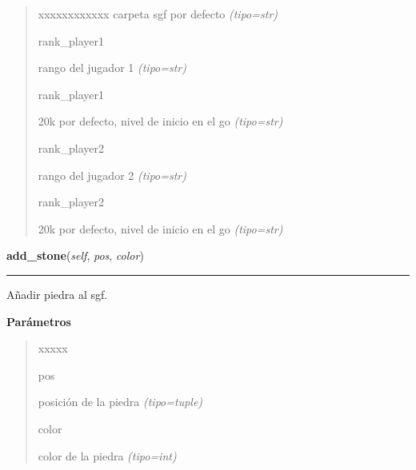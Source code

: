 \begin{boxedminipage}{\funcwidth}
\begin{quote}
\begin{Ventry}{xxxxxxxxxxxx}
carpeta sgf por defecto
            {\it (tipo=str)}

          \item[rank\_player1]


rango del jugador 1
            {\it (tipo=str)}

          \item[rank\_player1]


20k por defecto, nivel de inicio en el go
            {\it (tipo=str)}

          \item[rank\_player2]


rango del jugador 2
            {\it (tipo=str)}

          \item[rank\_player2]


20k por defecto, nivel de inicio en el go
            {\it (tipo=str)}

        \end{Ventry}

      \end{quote}

    \end{boxedminipage}

    \label{src:kifu:Kifu:add_stone}

    \vspace{0.5ex}

\hspace{.8\funcindent}\begin{boxedminipage}{\funcwidth}

    \raggedright \textbf{add\_stone}(\textit{self}, \textit{pos}, \textit{color})

    \vspace{-1.5ex}

    \rule{\textwidth}{0.5\fboxrule}
\setlength{\parskip}{2ex}
Añadir piedra al sgf.

\setlength{\parskip}{1ex}
      \textbf{Parámetros}
      \vspace{-1ex}

      \begin{quote}
        \begin{Ventry}{xxxxx}

          \item[pos]


posición de la piedra
            {\it (tipo=tuple)}

          \item[color]


color de la piedra
            {\it (tipo=int)}

        \end{Ventry}

      \end{quote}

    \end{boxedminipage}

